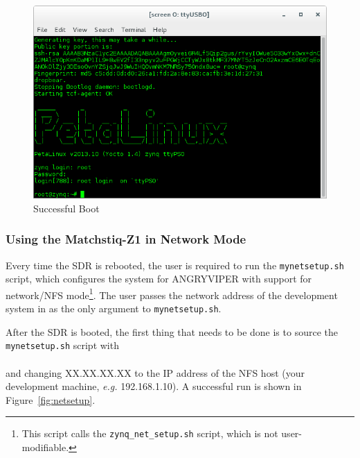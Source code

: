 \begin{figure}[ht]
	\centerline{\includegraphics[scale=0.5]{Matchstiq_Z1_login}}
	\caption{Successful Boot}
	\label{fig:boot1}
\end{figure}
\subsubsection*{Using the Matchstiq-Z1 in Network Mode}
\begin{flushleft}
Every time the SDR is rebooted, the user is required to run the \texttt{mynetsetup.sh} script, which configures the system for ANGRYVIPER with support for network/NFS mode\footnote{This script calls the \texttt{zynq\_net\_setup.sh} script, which is not user-modifiable.}. The user passes the network address of the development system in as the only argument to \texttt{mynetsetup.sh}.
\end{flushleft}
\begin{flushleft}
After the SDR is booted, the first thing that needs to be done is to source the \texttt{mynetsetup.sh} script with\\
\leavevmode{\parindent=3em\indent}\\
and changing XX.XX.XX.XX to the IP address of the NFS host (your development machine, \textit{e.g.} 192.168.1.10). A successful run is shown in Figure~\ref{fig:netsetup}.
\end{flushleft}

